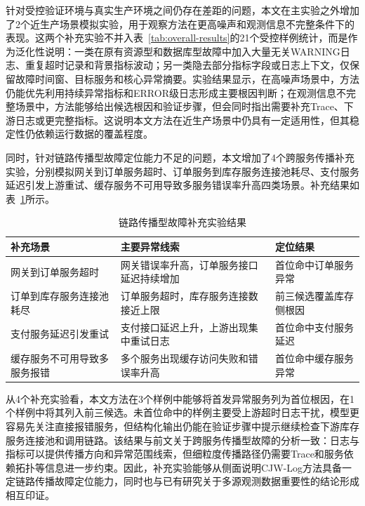 针对受控验证环境与真实生产环境之间仍存在差距的问题，本文在主实验之外增加了2个近生产场景模拟实验，用于观察方法在更高噪声和观测信息不完整条件下的表现。这两个补充实验不并入表~\ref{tab:overall-results}的21个受控样例统计，而是作为泛化性说明：一类在原有资源型和数据库型故障中加入大量无关WARNING日志、重复超时记录和背景指标波动；另一类隐去部分指标字段或日志上下文，仅保留故障时间窗、目标服务和核心异常摘要。实验结果显示，在高噪声场景中，方法仍能优先利用持续异常指标和ERROR级日志形成主要根因判断；在观测信息不完整场景中，方法能够给出候选根因和验证步骤，但会同时指出需要补充Trace、下游日志或更完整指标。这说明本文方法在近生产场景中仍具有一定适用性，但其稳定性仍依赖运行数据的覆盖程度。

同时，针对链路传播型故障定位能力不足的问题，本文增加了4个跨服务传播补充实验，分别模拟网关到订单服务超时、订单服务到库存服务连接池耗尽、支付服务延迟引发上游重试、缓存服务不可用导致多服务错误率升高四类场景。补充结果如表~\ref{tab:propagation-extra}所示。

\begin{table}[htbp]
\centering
\caption{链路传播型故障补充实验结果}
\label{tab:propagation-extra}
\small
\setlength{\tabcolsep}{4pt}
\renewcommand{\arraystretch}{1.12}
\begin{tabular}{p{3.0cm}p{5.0cm}p{3.0cm}}
\toprule
补充场景 & 主要异常线索 & 定位结果 \\
\midrule
网关到订单服务超时 & 网关错误率升高，订单服务接口延迟持续增加 & 首位命中订单服务异常 \\
订单到库存服务连接池耗尽 & 订单服务超时，库存服务连接数接近上限 & 前三候选覆盖库存侧根因 \\
支付服务延迟引发重试 & 支付接口延迟上升，上游出现集中重试日志 & 首位命中支付服务延迟 \\
缓存服务不可用导致多服务报错 & 多个服务出现缓存访问失败和错误率升高 & 首位命中缓存服务异常 \\
\bottomrule
\end{tabular}
\end{table}

从4个补充实验看，本文方法在3个样例中能够将首发异常服务列为首位根因，在1个样例中将其列入前三候选。未首位命中的样例主要受上游超时日志干扰，模型更容易先关注直接报错服务，但结构化输出仍能在验证步骤中提示继续检查下游库存服务连接池和调用链路。该结果与前文关于跨服务传播型故障的分析一致：日志与指标可以提供传播方向和异常范围线索，但细粒度传播路径仍需要Trace和服务依赖拓扑等信息进一步约束。因此，补充实验能够从侧面说明CJW-Log方法具备一定链路传播故障定位能力，同时也与已有研究关于多源观测数据重要性的结论形成相互印证。

